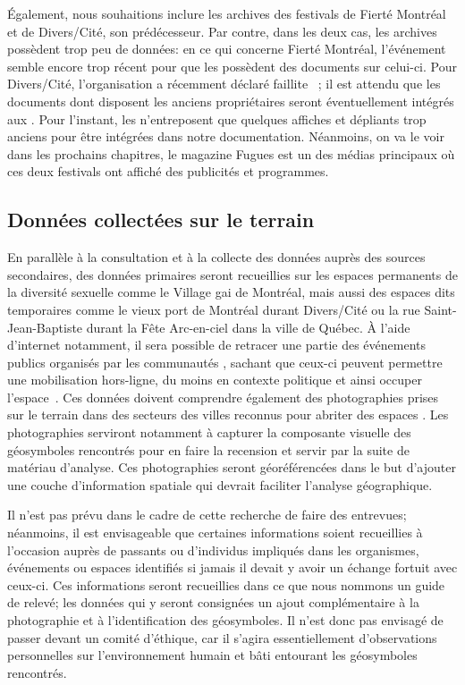 Également, nous souhaitions inclure les archives des festivals de Fierté Montréal et de Divers/Cité, son prédécesseur. 
Par contre, dans les deux cas, les archives possèdent trop peu de données: en ce qui concerne Fierté Montréal, l'événement semble encore trop récent pour que les \agq{} possèdent des documents sur celui-ci. 
Pour Divers/Cité, l'organisation a récemment déclaré faillite~\citep{Cormier2015} ; il est attendu que les documents dont disposent les anciens propriétaires seront éventuellement intégrés aux \agq{}. 
Pour l'instant, les \agq{} n'entreposent que quelques affiches et dépliants trop anciens pour être intégrées dans notre documentation. 
Néanmoins, on va le voir dans les prochains chapitres, le magazine Fugues est un des médias principaux où ces deux festivals ont affiché des publicités et programmes.

\subsection{Données collectées sur le terrain}
\label{sub:donnees_collectees_sur_le_terrain}
En parallèle à la consultation et à la collecte des données auprès des sources secondaires, des données primaires seront recueillies sur les espaces permanents de la diversité sexuelle comme le Village gai de Montréal, mais aussi des espaces dits temporaires comme le vieux port de Montréal durant Divers/Cité ou la rue Saint-Jean-Baptiste durant la Fête Arc-en-ciel dans la ville de Québec. 
À l'aide d'internet notamment, il sera possible de retracer une partie des événements publics organisés par les communautés \lgbt{}, sachant que ceux-ci peuvent permettre une mobilisation hors-ligne, du moins en contexte politique et ainsi occuper l'espace~\citep[153-154]{Mercea2011}. 
Ces données doivent comprendre également des photographies prises sur le terrain dans des secteurs des villes reconnus pour abriter des espaces \qus{}. 
Les photographies serviront notamment à capturer la composante visuelle des géosymboles rencontrés pour en faire la recension et servir par la suite de matériau d'analyse. 
Ces photographies seront géoréférencées dans le but d'ajouter une couche d'information spatiale qui devrait faciliter l'analyse géographique.

Il n'est pas prévu dans le cadre de cette recherche de faire des entrevues; néanmoins, il est envisageable que certaines informations soient recueillies à l'occasion auprès de passants ou d'individus impliqués dans les organismes, événements ou espaces identifiés si jamais il devait y avoir un échange fortuit avec ceux-ci. 
Ces informations seront recueillies dans ce que nous nommons un guide de relevé; les données qui y seront consignées un ajout complémentaire à la photographie et à l'identification des géosymboles. 
Il n'est donc pas envisagé de passer devant un comité d'éthique, car il s'agira essentiellement d'observations personnelles sur l'environnement humain et bâti entourant les géosymboles rencontrés.

